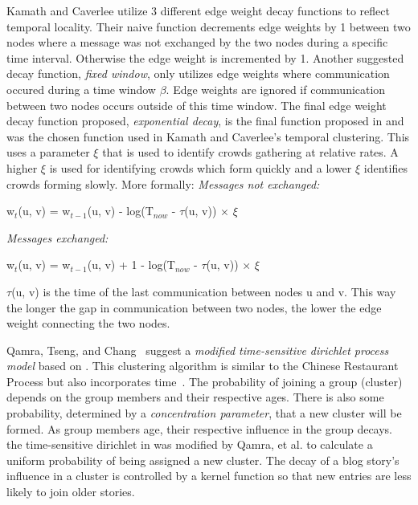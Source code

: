 \documentclass[12pt]{ucthesis}
\begin{document}
   Kamath and Caverlee utilize 3 different edge weight decay functions to reflect temporal
   locality. Their naive function decrements edge weights by 1 between two nodes
   where a message was not exchanged by the two nodes during a
   specific time interval. Otherwise the edge weight is incremented by 1. Another
   suggested decay function, \textit{fixed window}, only utilizes edge weights
   where communication occured during a time window $\beta$. Edge weights are
   ignored if communication between two nodes occurs outside of this time window. 
   The final edge weight decay function proposed, \textit{exponential decay}, is
   the final function proposed in \cite{Kamath:Transient} and was the chosen
   function used in Kamath and Caverlee's temporal clustering. This uses a
   parameter $\xi$ that is used to identify crowds gathering at
   relative rates. A higher $\xi$ is used for identifying crowds which form
   quickly and a lower $\xi$ identifies crowds forming slowly. More formally:
   \textit{Messages not exchanged:}
      \begin{description}
         \item w$_{t}$(u, v) = w$_{t - 1}$(u, v) - log(T$_{now}$ - $\tau$(u, v))
               $\times$  $\xi$ 
      \end{description}

   \textit{Messages exchanged:}
      \begin{description}
         \item w$_{t}$(u, v) = w$_{t - 1}$(u, v) + 1 - log(T$_{now}$ - $\tau$(u, v))
               $\times$  $\xi$ 
      \end{description}
   $\tau$(u, v) is the time of the last communication between nodes u and v. This
   way the longer the gap in communication between two nodes, the lower the edge
   weight connecting the two nodes.

   Qamra, Tseng, and Chang~\cite{Qamra:BlogMining} suggest a \textit{modified time-sensitive
   dirichlet process model} based on \cite{Jhu:Dirichlet}. This clustering
   algorithm is similar to the Chinese Restaurant Process but also incorporates
   time~\cite{Qamra:BlogMining}. The probability of joining a group (cluster) depends on the
   group members and their respective ages. There is also some probability,
   determined by a \textit{concentration parameter}, that a new cluster will be
   formed. As group members age, their respective influence in the group decays.
   the time-sensitive dirichlet in \cite{Jhu:Dirichlet} was modified by Qamra, et al.
   to calculate a uniform probability of being assigned a new cluster. The
   decay of a blog story's influence in a cluster is controlled by a kernel
   function so that new entries are less likely to join older stories.
   
\end{document}

